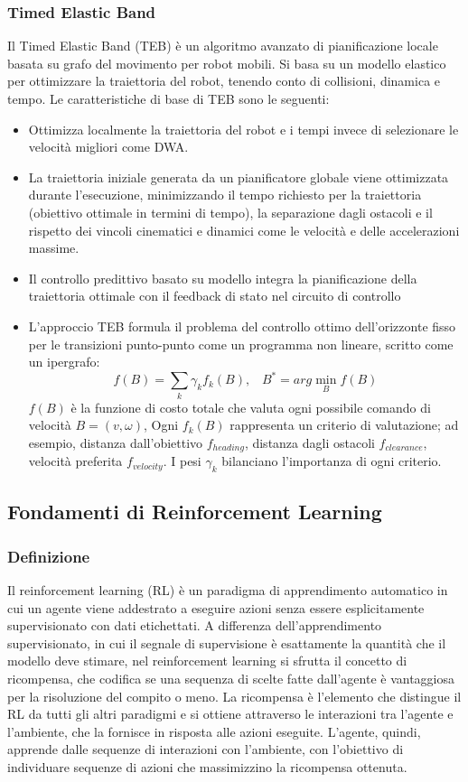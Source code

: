 \subsubsection{Timed Elastic Band} 
Il Timed Elastic Band (TEB) è un algoritmo avanzato di pianificazione locale basata su grafo del movimento per robot mobili. Si basa su un modello elastico per ottimizzare la traiettoria del robot, tenendo conto di collisioni, dinamica e tempo. Le caratteristiche di base di TEB sono le seguenti:
\begin{itemize}
    \item Ottimizza localmente la traiettoria del robot e i tempi invece di selezionare le velocità migliori come DWA.
    \item La traiettoria iniziale generata da un pianificatore globale viene ottimizzata durante l'esecuzione, minimizzando il tempo richiesto per la traiettoria (obiettivo ottimale in termini di tempo), la separazione dagli ostacoli e il rispetto dei vincoli cinematici e dinamici come le velocità e delle accelerazioni massime.
    \item Il controllo predittivo basato su modello integra la pianificazione della traiettoria ottimale con il feedback di stato nel circuito di controllo
    \item L'approccio TEB formula il problema del controllo ottimo dell'orizzonte fisso per le transizioni punto-punto come un programma non lineare, scritto come un ipergrafo:
    \[f(B)=\sum_k\gamma_kf_k(B),\;\;\;B^*=arg \min_Bf(B)\]
    $f(B)$ è la funzione di costo totale che valuta ogni possibile comando di velocità $B=(v,\omega)$, Ogni $f_k(B)$ rappresenta un criterio di valutazione; ad esempio, distanza dall'obiettivo $f_{heading}$, distanza dagli ostacoli $f_{clearance}$, velocità preferita $f_{velocity}$. I pesi $\gamma_k$ bilanciano l'importanza di ogni criterio.
\end{itemize}


\subsection{Fondamenti di Reinforcement Learning}
\subsubsection{Definizione}
Il reinforcement learning (RL) è un paradigma di apprendimento automatico in cui un agente viene addestrato a eseguire azioni senza essere esplicitamente supervisionato con dati etichettati. A differenza dell'apprendimento supervisionato, in cui il segnale di supervisione è esattamente la quantità che il modello deve stimare, nel reinforcement learning si sfrutta il concetto di ricompensa, che codifica se una sequenza di scelte fatte dall'agente è vantaggiosa per la risoluzione del compito o meno. La ricompensa è l'elemento che distingue il RL da tutti gli altri paradigmi e si ottiene attraverso le interazioni tra l'agente e l'ambiente, che la fornisce in risposta alle azioni eseguite. L'agente, quindi, apprende dalle sequenze di interazioni con l'ambiente, con l'obiettivo di individuare sequenze di azioni che massimizzino la ricompensa ottenuta. 


